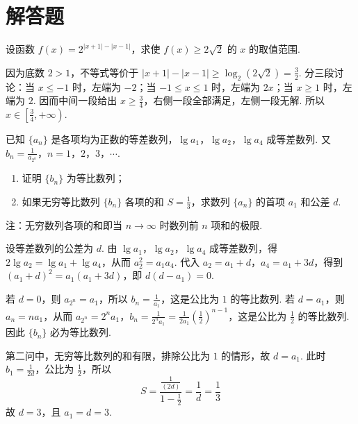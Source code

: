 \section{解答题}
\begin{problem}
设函数 \( f(x) = 2^{|x + 1| - |x - 1|} \)，求使 \( f(x) \geqslant 2\sqrt{2} \) 的 \( x \) 的取值范围.
\end{problem}

\begin{solution}
因为底数 \(2>1\)，不等式等价于 \(|x+1|-|x-1|\geqslant\log_2(2\sqrt2)=\frac32\).
分三段讨论：当 \(x\leqslant-1\) 时，左端为 \(-2\)；当 \(-1\leqslant x\leqslant1\) 时，左端为 \(2x\)；当 \(x\geqslant1\) 时，左端为 \(2\). 因而中间一段给出 \(x\geqslant\frac34\)，右侧一段全部满足，左侧一段无解. 所以 \(x\in\left[\frac34,+\infty\right)\).
\end{solution}

\begin{problem}
已知 \( \{a_{n}\} \) 是各项均为正数的等差数列，\(\lg a_1\)，\(\lg a_2\)，\(\lg a_4\) 成等差数列. 又 \(b_{n} = \frac{1}{a_{2^n}}\)，\(n = 1\)，\(2\)，\(3\)，\(\cdots\).

\begin{enumerate}
\item 证明 \( \{b_{n}\} \) 为等比数列；
\item 如果无穷等比数列 \( \{b_{n}\} \) 各项的和 \( S = \frac{1}{3} \)，求数列 \( \{a_{n}\} \) 的首项 \( a_{1} \) 和公差 \( d \).
\end{enumerate}

注：无穷数列各项的和即当 \(n \to \infty\) 时数列前 \(n\) 项和的极限.
\end{problem}

\begin{solution}
设等差数列的公差为 \(d\). 由 \(\lg a_1\)，\(\lg a_2\)，\(\lg a_4\) 成等差数列，得 \(2\lg a_2=\lg a_1+\lg a_4\)，从而 \(a_2^2=a_1a_4\). 代入 \(a_2=a_1+d\)，\(a_4=a_1+3d\)，得到 \((a_1+d)^2=a_1(a_1+3d)\)，即 \(d(d-a_1)=0\).

若 \(d=0\)，则 \(a_{2^n}=a_1\)，所以 \(b_n=\frac1{a_1}\)，这是公比为 \(1\) 的等比数列. 若 \(d=a_1\)，则 \(a_n=na_1\)，从而 \(a_{2^n}=2^n a_1\)，\(b_n=\frac{1}{2^n a_1}=\frac{1}{2a_1}\left(\frac12\right)^{n-1}\)，这是公比为 \(\frac12\) 的等比数列. 因此 \(\{b_n\}\) 必为等比数列.

第二问中，无穷等比数列的和有限，排除公比为 \(1\) 的情形，故 \(d=a_1\). 此时 \(b_1=\frac{1}{2d}\)，公比为 \(\frac12\)，所以
\[
S=\frac{\frac{1}{(2d)}}{1-\frac{1}{2}}=\frac1d=\frac13
\]
故 \(d=3\)，且 \(a_1=d=3\).
\end{solution}

